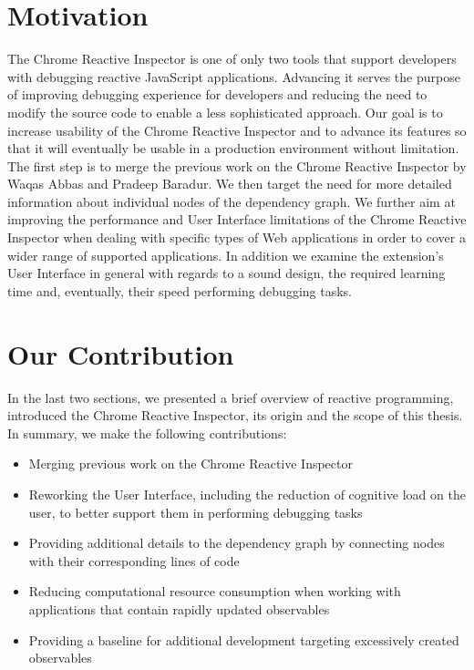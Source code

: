 \section{Motivation}
The Chrome Reactive Inspector is one of only two tools that support developers with debugging reactive JavaScript applications. Advancing it serves the purpose of improving debugging experience for developers and reducing the need to modify the source code to enable a less sophisticated approach. Our goal is to increase usability of the Chrome Reactive Inspector and to advance its features so that it will eventually be usable in a production environment without limitation. The first step is to merge the previous work on the Chrome Reactive Inspector by Waqas Abbas and Pradeep Baradur. We then target the need for more detailed information about individual nodes of the dependency graph. We further aim at improving the performance and User Interface limitations of the Chrome Reactive Inspector when dealing with specific types of Web applications in order to cover a wider range of supported applications. In addition we examine the extension's User Interface in general with regards to a sound design, the required learning time and, eventually, their speed performing debugging tasks.

\section{Our Contribution}

In the last two sections, we presented a brief overview of reactive programming, introduced the Chrome Reactive Inspector, its origin and the scope of this thesis.
In summary, we make the following contributions:

\begin{itemize}
	\item Merging previous work on the Chrome Reactive Inspector
	\item Reworking the User Interface, including the reduction of cognitive load on the user, to better support them in performing debugging tasks
	\item Providing additional details to the dependency graph by connecting nodes with their corresponding lines of code
	\item Reducing computational resource consumption when working with applications that contain rapidly updated observables
	\item Providing a baseline for additional development targeting excessively created observables
\end{itemize}

